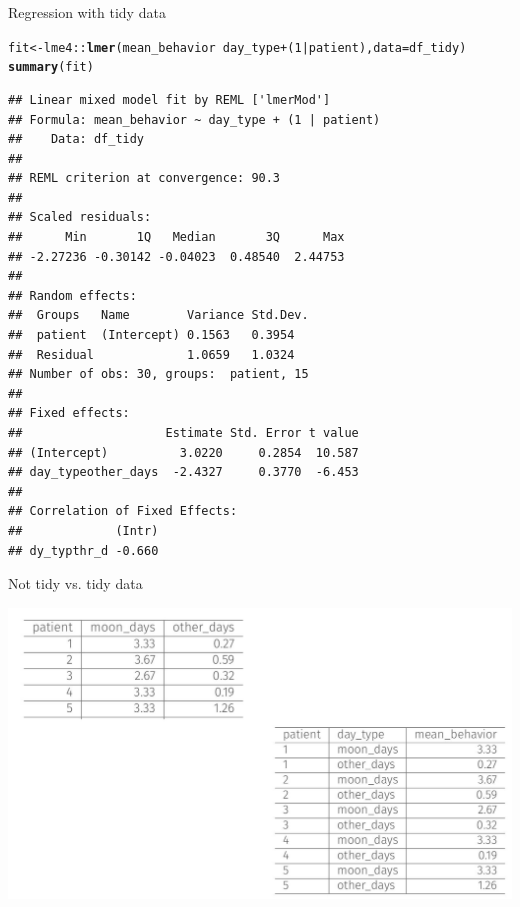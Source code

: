 \documentclass{beamer}\usepackage[]{graphicx}\usepackage[]{color}
\newcommand{\hlnum}[1]{\textcolor[rgb]{0.686,0.059,0.569}{#1}}%
\newcommand{\hlopt}[1]{\textcolor[rgb]{0,0,0}{#1}}%
\newcommand{\hlstd}[1]{\textcolor[rgb]{0.345,0.345,0.345}{#1}}%
\newcommand{\hlkwb}[1]{\textcolor[rgb]{0.69,0.353,0.396}{#1}}%
\newcommand{\hlkwc}[1]{\textcolor[rgb]{0.333,0.667,0.333}{#1}}%
\newcommand{\hlkwd}[1]{\textcolor[rgb]{0.737,0.353,0.396}{\textbf{#1}}}%
\newenvironment{knitrout}{}{} %
\begin{document}
\begin{frame}[fragile]{Regression with tidy data}
	
	
\begin{knitrout}\tiny
{}\color{fgcolor}
\begin{alltt}
\hlstd{fit} \hlkwb{<-} \hlstd{lme4}\hlopt{::}\hlkwd{lmer}\hlstd{(mean_behavior} \hlopt{~} \hlstd{day_type} \hlopt{+} \hlstd{(}\hlnum{1}\hlopt{|}\hlstd{patient),} \hlkwc{data} \hlstd{= df_tidy)}
\hlkwd{summary}\hlstd{(fit)}
\end{alltt}
\begin{verbatim}
## Linear mixed model fit by REML ['lmerMod']
## Formula: mean_behavior ~ day_type + (1 | patient)
##    Data: df_tidy
## 
## REML criterion at convergence: 90.3
## 
## Scaled residuals: 
##      Min       1Q   Median       3Q      Max 
## -2.27236 -0.30142 -0.04023  0.48540  2.44753 
## 
## Random effects:
##  Groups   Name        Variance Std.Dev.
##  patient  (Intercept) 0.1563   0.3954  
##  Residual             1.0659   1.0324  
## Number of obs: 30, groups:  patient, 15
## 
## Fixed effects:
##                    Estimate Std. Error t value
## (Intercept)          3.0220     0.2854  10.587
## day_typeother_days  -2.4327     0.3770  -6.453
## 
## Correlation of Fixed Effects:
##             (Intr)
## dy_typthr_d -0.660
\end{verbatim}

\end{knitrout}
\end{frame}



\begin{frame}[fragile]{Not tidy vs. tidy data}
	
	
	
	\includegraphics[scale=0.45]{figure/tidy3.pdf}
	
	
	
\end{frame}
\end{document}
